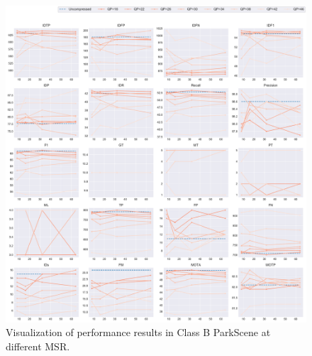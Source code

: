 \begin{figure}[!htbp]
\centering
\includegraphics[width=1.0\linewidth]{img/appendix/ParkScene_all_multiplots_msr.pdf}
\caption[Visualization of performance results in Class B ParkScene at different MSR]
{Visualization of performance results in Class B ParkScene at different MSR.}
\label{fig:ParkScene_all_msr}
\end{figure}



